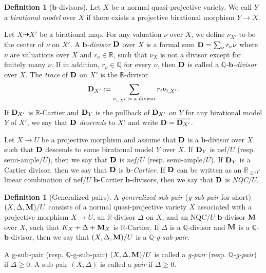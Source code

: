 \documentclass[11pt]{amsart}
\numberwithin{equation}{section}
\newcommand{\bb}{\bm{b}}
\newcommand{\Mm}{{\bf{M}}}
\newcommand{\Dd}{{\bf{D}}}
\newcommand{\Qq}{\mathbb{Q}}
\newcommand{\Rr}{\mathbb{R}}
\theoremstyle{definition}
\newtheorem{defn}[thm]{Definition}
\theoremstyle{definition}
\theoremstyle{definition}
\begin{document}
\begin{defn}[$\bb$-divisors]\label{defn: b divisors} Let $X$ be a normal quasi-projective variety. We call $Y$ a \emph{birational model} over $X$ if there exists a projective birational morphism $Y\to X$. 

Let $X\dashrightarrow X'$ be a birational map. For any valuation $\nu$ over $X$, we define $\nu_{X'}$ to be the center of $\nu$ on $X'$. A \emph{$\bb$-divisor} $\Dd$ over $X$ is a formal sum $\Dd=\sum_{\nu} r_{\nu}\nu$ where $\nu$ are valuations over $X$ and $r_{\nu}\in\mathbb R$, such that $\nu_X$ is not a divisor except for finitely many $\nu$. If in addition, $r_{\nu}\in\Qq$ for every $\nu$, then $\Dd$ is called a \emph{$\Qq$-$\bb$-divisor} over $X$. The \emph{trace} of $\Dd$ on $X'$ is the $\Rr$-divisor
$$\Dd_{X'}:=\sum_{\nu_{i,X'}\text{ is a divisor}}r_i\nu_{i,X'}.$$
If $\Dd_{X'}$ is $\Rr$-Cartier and $\Dd_{Y}$ is the pullback of $\Dd_{X'}$ on $Y$ for any birational model $Y$ of $X'$, we say that $\Dd$ \emph{descends} to $X'$ and write $\Dd=\overline{\Dd_{X'}}$. %

Let $X\rightarrow U$ be a projective morphism and assume that $\Dd$ is a $\bb$-divisor over $X$ such that $\Dd$ descends to some birational model $Y$ over $X$. If $\Dd_Y$ is nef$/U$ (resp. semi-ample$/U$), then we say that $\Dd$ is \emph{nef}$/U$ (resp. semi-ample$/U$). If $\Dd_Y$ is a Cartier divisor, then we say that $\Dd$ is \emph{$\bb$-Cartier}. If $\Dd$ can be written as an $\Rr_{\geq 0}$-linear combination of nef$/U$ $\bb$-Cartier $\bb$-divisors, then we say that $\Dd$ is \emph{NQC}$/U$.
\end{defn}



\begin{defn}[Generalized pairs]\label{defn: g-pairs}
A \emph{generalized sub-pair} (\emph{g-sub-pair} for short) $(X,\Delta,\Mm)/U$ consists of a normal quasi-projective variety $X$ associated with a projective morphism $X\rightarrow U$, an $\Rr$-divisor $\Delta$ on $X$, and an NQC$/U$ $\bb$-divisor $\Mm$ over $X$, such that $K_X+\Delta+\Mm_X$ is $\Rr$-Cartier. If $\Delta$ is a $\Qq$-divisor and $\Mm$ is a $\Qq$-$\bb$-divisor, then we say that $(X,\Delta,\Mm)/U$ is a \emph{$\Qq$-g-sub-pair}.



A g-sub-pair (resp. $\Qq$-g-sub-pair) $(X,\Delta,\Mm)/U$ is called a \emph{g-pair} (resp. \emph{$\Qq$-g-pair}) if $\Delta\geq 0$. A sub-pair $(X,\Delta)$ is called a \emph{pair} if $\Delta\geq 0$.
\end{defn}
\end{document}
